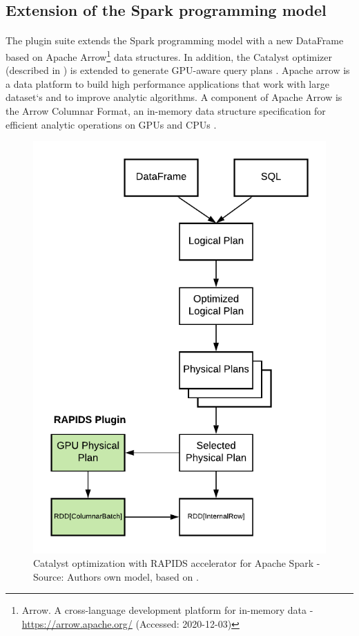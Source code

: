 \subsection{Extension of the Spark programming model}
\label{subsec:04_rapids_ext}
\paragraph{}The plugin suite extends the Spark programming model with a new DataFrame based on Apache Arrow\footnote{Arrow. A cross-language development platform for in-memory data - \url{https://arrow.apache.org/} (Accessed: 2020-12-03)} data structures. In addition, the Catalyst optimizer (described in ) is extended to generate GPU-aware query plans \cite{Mcdonald2020SparkRapids}.
Apache arrow is a data platform to build high performance applications that work with large dataset`s and to improve analytic algorithms. A component of Apache Arrow is the Arrow Columnar Format, an in-memory data structure specification for efficient analytic operations on GPUs and CPUs \cite{ApacheArrow2020Docs}.


\begin{figure}[h]
\centering
\includegraphics[scale=1]{images/04_technical_background/rapids/rapids_catalyst_optimization_process}
\caption{Catalyst optimization with RAPIDS accelerator for Apache Spark - Source: Authors own model, based on \cite{Mcdonald2020SparkRapids}.}
\label{fig:04_rapids_ext_query-plan}
\end{figure}
